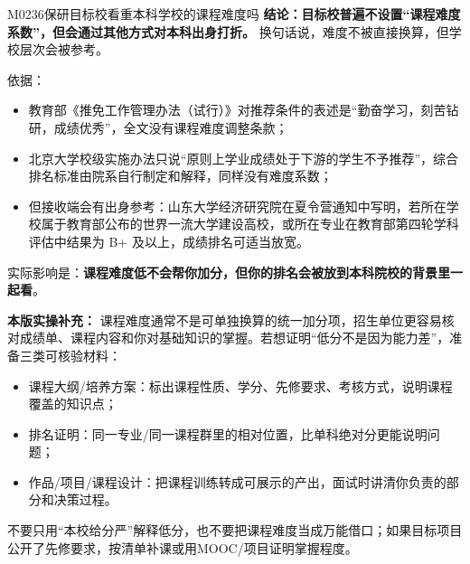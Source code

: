 \begin{qa}{M0236}{保研目标校看重本科学校的课程难度吗}
\textbf{结论：目标校普遍不设置“课程难度系数”，但会通过其他方式对本科出身打折。} 换句话说，难度不被直接换算，但学校层次会被参考。

依据：
\begin{itemize}
  \item 教育部《推免工作管理办法（试行）》对推荐条件的表述是“勤奋学习，刻苦钻研，成绩优秀”，全文没有课程难度调整条款；
  \item 北京大学校级实施办法只说“原则上学业成绩处于下游的学生不予推荐”，综合排名标准由院系自行制定和解释，同样没有难度系数；
  \item 但接收端会有出身参考：山东大学经济研究院在夏令营通知中写明，若所在学校属于教育部公布的世界一流大学建设高校，或所在专业在教育部第四轮学科评估中结果为 B+ 及以上，成绩排名可适当放宽。
\end{itemize}

实际影响是：\textbf{课程难度低不会帮你加分，但你的排名会被放到本科院校的背景里一起看}。
\par\textbf{本版实操补充：} 课程难度通常不是可单独换算的统一加分项，招生单位更容易核对成绩单、课程内容和你对基础知识的掌握。若想证明“低分不是因为能力差”，准备三类可核验材料：

\begin{itemize}
  \item 课程大纲/培养方案：标出课程性质、学分、先修要求、考核方式，说明课程覆盖的知识点；
  \item 排名证明：同一专业/同一课程群里的相对位置，比单科绝对分更能说明问题；
  \item 作品/项目/课程设计：把课程训练转成可展示的产出，面试时讲清你负责的部分和决策过程。
\end{itemize}

不要只用“本校给分严”解释低分，也不要把课程难度当成万能借口；如果目标项目公开了先修要求，按清单补课或用MOOC/项目证明掌握程度。
\end{qa}

